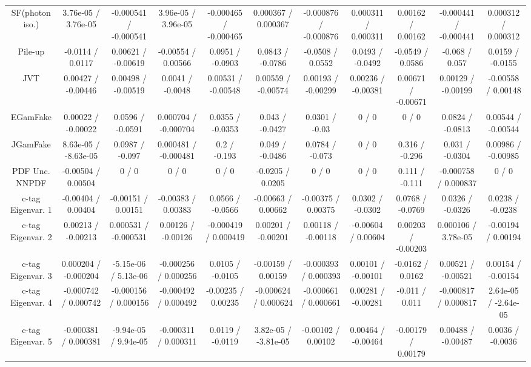{\begin{landscape}
\begin{longtable}{@{\extracolsep{\fill}}| *{11}{c|}}
  SF(photon iso.) & 3.76e-05 / 3.76e-05 & -0.000541 / -0.000541 & 3.96e-05 / 3.96e-05 & -0.000465 / -0.000465 & 0.000367 / 0.000367 & -0.000876 / -0.000876 & 0.000311 / 0.000311 & 0.00162 / 0.00162 & -0.000441 / -0.000441 & 0.000312 / 0.000312 \\ 
  Pile-up & -0.0114 / 0.0117 & 0.00621 / -0.00619 & -0.00554 / 0.00566 & 0.0951 / -0.0903 & 0.0843 / -0.0786 & -0.0508 / 0.0552 & 0.0493 / -0.0492 & -0.0549 / 0.0586 & -0.068 / 0.057 & 0.0159 / -0.0155 \\ 
  JVT & 0.00427 / -0.00446 & 0.00498 / -0.00519 & 0.0041 / -0.0048 & 0.00531 / -0.00548 & 0.00559 / -0.00574 & 0.00193 / -0.00299 & 0.00236 / -0.00381 & 0.00671 / -0.00671 & 0.00129 / -0.00199 & -0.00558 / 0.00148 \\ 
  EGamFake & 0.00022 / -0.00022 & 0.0596 / -0.0591 & 0.000704 / -0.000704 & 0.0355 / -0.0353 & 0.043 / -0.0427 & 0.0301 / -0.03 & 0 / 0 & 0 / 0 & 0.0824 / -0.0813 & 0.00544 / -0.00544 \\ 
  JGamFake & 8.63e-05 / -8.63e-05 & 0.0987 / -0.097 & 0.000481 / -0.000481 & 0.2 / -0.193 & 0.049 / -0.0486 & 0.0784 / -0.073 & 0 / 0 & 0.316 / -0.296 & 0.031 / -0.0304 & 0.00986 / -0.00985 \\ 
  PDF Unc. NNPDF & -0.00504 / 0.00504 & 0 / 0 & 0 / 0 & 0 / 0 & -0.0205 / 0.0205 & 0 / 0 & 0 / 0 & 0.111 / -0.111 & -0.000758 / 0.000837 & 0 / 0 \\ 
  c-tag Eigenvar. 1 & -0.00404 / 0.00404 & -0.00151 / 0.00151 & -0.00383 / 0.00383 & 0.0566 / -0.0566 & -0.00663 / 0.00662 & -0.00375 / 0.00375 & 0.0302 / -0.0302 & 0.0768 / -0.0769 & 0.0326 / -0.0326 & 0.0238 / -0.0238 \\ 
  c-tag Eigenvar. 2 & 0.00213 / -0.00213 & 0.000531 / -0.000531 & 0.00126 / -0.00126 & -0.000419 / 0.000419 & 0.00201 / -0.00201 & 0.00118 / -0.00118 & -0.00604 / 0.00604 & 0.00203 / -0.00203 & 0.000106 / 3.78e-05 & -0.00194 / 0.00194 \\ 
  c-tag Eigenvar. 3 & 0.000204 / -0.000204 & -5.15e-06 / 5.13e-06 & -0.000256 / 0.000256 & 0.0105 / -0.0105 & -0.00159 / 0.00159 & -0.000393 / 0.000393 & 0.00101 / -0.00101 & -0.0162 / 0.0162 & 0.00521 / -0.00521 & 0.00154 / -0.00154 \\ 
  c-tag Eigenvar. 4 & -0.000742 / 0.000742 & -0.000156 / 0.000156 & -0.000492 / 0.000492 & -0.00235 / 0.00235 & -0.000624 / 0.000624 & -0.000661 / 0.000661 & 0.00281 / -0.00281 & -0.011 / 0.011 & -0.000817 / 0.000817 & 2.64e-05 / -2.64e-05 \\ 
  c-tag Eigenvar. 5 & -0.000381 / 0.000381 & -9.94e-05 / 9.94e-05 & -0.000311 / 0.000311 & 0.0119 / -0.0119 & 3.82e-05 / -3.81e-05 & -0.00102 / 0.00102 & 0.00464 / -0.00464 & -0.00179 / 0.00179 & 0.00488 / -0.00487 & 0.0036 / -0.0036 \\ 

\end{longtable}
\end{landscape}}

